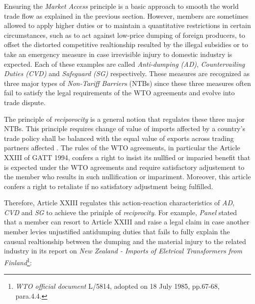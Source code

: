 

Ensuring the \textit{Market Access} principle 
is a basic approach to smooth the world trade flow as explained in the previous section. %
However, members are sometimes allowed to apply higher duties or to maintain a quantitative restrictions in certain circumstances, such as 
to act against low-price dumping of foreign producers, to offset the distorted competitive realtionship resulted by the illegal subsidies
or to take an emergency measure in case irrevisible injury to domestic industry is expected. Each of these examples 
are called \textit{Anti-dumping (AD)}, \textit{Countervailing Duties (CVD)} and \textit{Safeguard (SG)} respectively. These measures are recognized as 
three major types of \textit{Non-Tariff Barriers} (NTBs) %
since these three measures often fail to satisfy the legal requirements of the WTO agreements and evolve into trade dispute.

The principle of \textit{reciporocity} is a general notion that regulates these three major NTBs.
This principle requires change of value of imports affected by a country's trade policy 
shall be balanced with the equal value of exports across trading partners affected \citep{bagwell1999}.
The rules of the WTO agreements, in particular the Article XXIII of GATT 1994, 
confers a right to insist its nullfied or imparied benefit that is expected under the WTO agreements and require satisfactory adjustement to the member 
who results in such nullification or impariment. Moreover, this article confers a right to retaliate if no satisfatory adjustment being fulfilled.

Therefore, Article XXIII regulates this action-reaction characteristics of \textit{AD}, \textit{CVD} and \textit{SG} to achieve the priniple of \textit{reciprocity}. %
For example, \textit{Panel} stated that a member can resort to Article XXIII and raise a legal claim in case another member levies unjustified antidumping duties that fails to fully explain the causual realtionship between the dumping and the material injury to the related industry in its report on \textit{New Zealand - Imports of Eletrical Transformers from Finland}\footnote{\textit{WTO official document} L/5814, adopted on 18 July 1985, pp.67-68, para.4.4.}:

